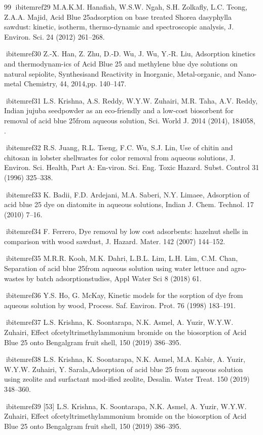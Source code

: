 \documentclass[final,5p,times,twocolumn,authoryear]{elsarticle}
\begin{document}
\begin{thebibliography}{99}
ibitem{ref29} M.A.K.M. Hanaﬁah, W.S.W. Ngah, S.H. Zolkaﬂy, L.C. Teong, Z.A.A. Majid, Acid Blue 25adsorption on base treated Shorea dasyphylla sawdust: kinetic, isotherm, thermo-dynamic and spectroscopic analysis, J. Environ. Sci. 24 (2012) 261–268.

ibitem{ref30} Z.-X. Han, Z. Zhu, D.-D. Wu, J. Wu, Y.-R. Liu, Adsorption kinetics and thermodynam-ics of Acid Blue 25 and methylene blue dye solutions on natural sepiolite, Synthesisand Reactivity in Inorganic, Metal-organic, and Nano-metal Chemistry, 44, 2014,pp. 140–147.

ibitem{ref31} L.S. Krishna, A.S. Reddy, W.Y.W. Zuhairi, M.R. Taha, A.V. Reddy, Indian jujuba seedpowder as an eco-friendly and a low-cost biosorbent for removal of acid blue 25from aqueous solution, Sci. World J. 2014 (2014), 184058, .

ibitem{ref32} R.S. Juang, R.L. Tseng, F.C. Wu, S.J. Lin, Use of chitin and chitosan in lobster shellwastes for color removal from aqueous solutions, J. Environ. Sci. Health, Part A: En-viron. Sci. Eng. Toxic Hazard. Subst. Control 31 (1996) 325–338.

ibitem{ref33} K. Badii, F.D. Ardejani, M.A. Saberi, N.Y. Limaee, Adsorption of acid blue 25 dye on diatomite in aqueous solutions, Indian J. Chem. Technol. 17 (2010) 7–16.

ibitem{ref34} F. Ferrero, Dye removal by low cost adsorbents: hazelnut shells in comparison with wood sawdust, J. Hazard. Mater. 142 (2007) 144–152.

ibitem{ref35} M.R.R. Kooh, M.K. Dahri, L.B.L. Lim, L.H. Lim, C.M. Chan, Separation of acid blue 25from aqueous solution using water lettuce and agro-wastes by batch adsorptionstudies, Appl Water Sci 8 (2018) 61.

ibitem{ref36} Y.S. Ho, G. McKay, Kinetic models for the sorption of dye from aqueous solution by wood, Process. Saf. Environ. Prot. 76 (1998) 183–191.

ibitem{ref37} L.S. Krishna, K. Soontarapa, N.K. Asmel, A. Yuzir, W.Y.W. Zuhairi, Effect ofcetyltrimethylammonium bromide on the biosorption of Acid Blue 25 onto Bengalgram fruit shell, 150 (2019) 386–395.

ibitem{ref38} L.S. Krishna, K. Soontarapa, N.K. Asmel, M.A. Kabir, A. Yuzir, W.Y.W. Zuhairi, Y. Sarala,Adsorption of acid blue 25 from aqueous solution using zeolite and surfactant mod-iﬁed zeolite, Desalin. Water Treat. 150 (2019) 348–360.

ibitem{ref39} [53] L.S. Krishna, K. Soontarapa, N.K. Asmel, A. Yuzir, W.Y.W. Zuhairi, Effect ofcetyltrimethylammonium bromide on the biosorption of Acid Blue 25 onto Bengalgram fruit shell, 150 (2019) 386–395.


\end{thebibliography}
\end{document}
